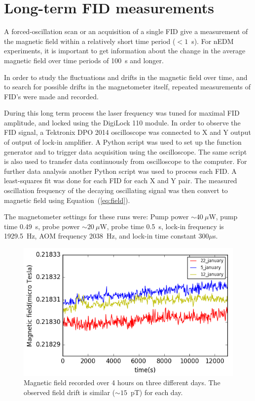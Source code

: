 \section{Long-term FID measurements\label{sec:long-term}}

A forced-oscillation scan or an acquisition of a single FID give a
measurement of the magnetic field within a relatively short time
period ($<1$~s).  For nEDM experiments, it is important to get
information about the change in the average magnetic field over time
periods of 100~s and longer.

In order to study the fluctuations and drifts in the magnetic field
over time, and to search for possible drifts in the magnetometer
itself, repeated measurements of FID's were made and recorded.

During this long term process the laser frequency was tuned for
maximal FID amplitude, and locked using the DigiLock 110 module.  In
order to observe the FID signal, a Tektronix DPO 2014 oscilloscope was
connected to X and Y output of output of lock-in amplifier. A Python
script was used to set up the function generator and to trigger data
acquisition using the oscilloscope. The same script is also used to
transfer data continuously from oscilloscope to the computer.  For
further data analysis another Python script was used to process each
FID.  A least-squares fit was done for each FID for each X and Y pair.
The measured oscillation frequency of the decaying oscillating signal
was then convert to magnetic field using Equation~(\ref{eq:field}).

The magnetometer settings for these runs were: Pump power $\sim
40~\mu$W, pump time 0.49~s, probe power $\sim 20~\mu$W, probe time
0.5~s, lock-in frequency is 1929.5~Hz, AOM frequency 2038~Hz, and
lock-in time constant 300$\mu$s.

\begin{figure}%
\centering\includegraphics[width=0.85\linewidth]{figures/field_3_day}
\caption{Magnetic field recorded over 4 hours on three different
  days. The observed field drift is similar ($\sim 15$~pT) for each
  day.\label{fig:long-term-field}}
\end{figure}

